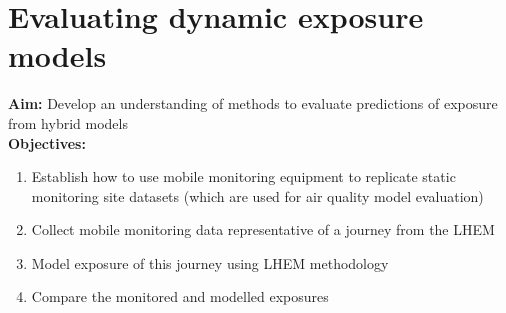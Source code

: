\section{Evaluating dynamic exposure models}

\textbf{Aim:} Develop an understanding of methods to evaluate predictions of exposure from hybrid models \\
\textbf{Objectives:}

\begin{enumerate}
    \item Establish how to use mobile monitoring equipment to replicate static monitoring site datasets (which are used for air quality model evaluation)
    \item Collect mobile monitoring data representative of a journey from the LHEM
    \item Model exposure of this journey using LHEM methodology
    \item Compare the monitored and modelled exposures
\end{enumerate}